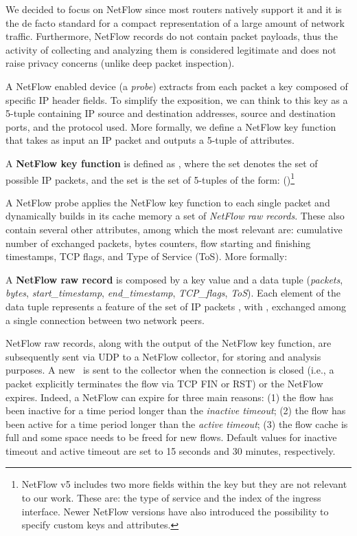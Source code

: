 \documentclass[10pt,conference,compsocconf,letterpaper]{IEEEtran}
\begin{document}
We decided to focus on NetFlow since most routers natively support it 
and it is the de facto standard for a compact representation of a large
amount of network traffic.  Furthermore, NetFlow records do not 
contain packet payloads, thus the activity of collecting and analyzing them 
is considered legitimate and does not raise privacy concerns (unlike deep packet
inspection). 

A NetFlow enabled device (a \textit{probe}) extracts from each
packet a key composed of specific IP header fields. To simplify the
exposition, we can think to this key as a 5-tuple containing IP
source and destination addresses, source and
destination ports, and the protocol used. More formally, we define a NetFlow 
key function that takes as input an IP packet and outputs a
5-tuple of attributes.
\begin{definition}
  A \textbf{NetFlow key function} \textbf{\fkey} is defined as
  , where the
  set  denotes the set of possible IP packets, and the
  set  is the set of 5-tuples of the form:
  ()\footnote{\small NetFlow v5 includes two more
    fields within the key but they are not relevant to our work. These
    are: the type of service and the index of the ingress
    interface. Newer NetFlow versions have also introduced the
    possibility to specify custom keys and attributes.}
\end{definition}
A NetFlow probe applies the NetFlow key
function to each single packet and dynamically builds in its cache
memory a set of \emph{NetFlow raw records}. These also contain several other attributes, among which
the most relevant are: cumulative number of exchanged packets, bytes counters, flow starting and finishing
timestamps, TCP flags, and Type of Service (ToS). 
More formally:
\begin{definition}
  A \textbf{NetFlow raw record \nfr} is composed by a key value
   and a data tuple (\textit{packets},
  \textit{bytes}, \textit{start\_timestamp}, \textit{end\_timestamp},
  \textit{TCP\_flags}, \textit{ToS}). Each element of the data tuple represents a
  feature of the set of IP packets , with
  , exchanged among a single connection between two network peers.
\end{definition}

NetFlow raw records, along with the output of the NetFlow key function,
are subsequently sent via UDP to a NetFlow collector, for storing and
analysis purposes. A new \nfr\ is sent to the collector when the connection is
closed (i.e., a packet explicitly terminates the flow via TCP FIN or RST) 
or the NetFlow expires. Indeed, a NetFlow can expire for three main reasons: 
(1) the flow has been inactive for a time period longer than the
  \textit{inactive timeout};
(2) the flow has been active for a time period longer than the
  \textit{active timeout};
(3) the flow cache is full and some space needs to be freed for new
  flows.
Default values for inactive timeout and active timeout are set to 15 seconds
and 30 minutes, respectively. 
\end{document}
